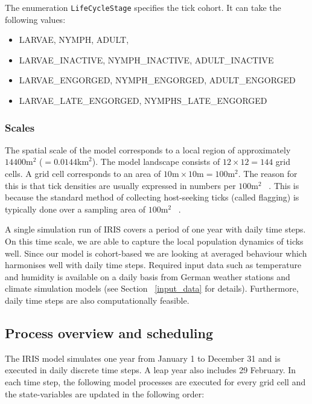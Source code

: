 \documentclass[a4paper, 11pt]{scrartcl}
\newcommand{\inlinecode}[1]{\texttt{\small #1}}
\begin{document}
The enumeration \inlinecode{LifeCycleStage} specifies the tick cohort. It can take the following values:
\begin{small}
\begin{itemize}[noitemsep]
	\item LARVAE, NYMPH, ADULT,  
	\item LARVAE\_INACTIVE, NYMPH\_INACTIVE, ADULT\_INACTIVE
	\item LARVAE\_ENGORGED, NYMPH\_ENGORGED, ADULT\_ENGORGED
	\item LARVAE\_LATE\_ENGORGED, NYMPHS\_LATE\_ENGORGED
\end{itemize}
\end{small}


\subsubsection{Scales}
The spatial scale of the model corresponds to a local region of approximately $14400 \mathrm{m}^{2}$ ($= 0.0144 \mathrm{km}^{2}$). The model landscape consists of $12 \times 12 = 144$ grid cells. A grid cell corresponds to an area of $10 \mathrm{m} \times 10 \mathrm{m} = 100 \mathrm{m}^{2}$. The reason for this is that tick densities are usually expressed in numbers per $100 \mathrm{m}^{2}$ ~\parencite[see e.g.][Table 2]{Boehnke.2015}. This is because the standard method of collecting host-seeking ticks (called flagging) is typically done over a sampling area of $100 \mathrm{m}^{2}$ ~\parencite{Brugger.2016, Schulz.2014}.

A single simulation run of IRIS covers a period of one year with daily time steps. On this time scale, we are able to capture the local population dynamics of ticks well. Since our model is cohort-based we are looking at averaged behaviour which harmonises well with daily time steps. Required input data such as temperature and humidity is available on a daily basis from German weather stations and climate simulation models (see Section ~\ref{input_data} for details). Furthermore, daily time steps are also computationally feasible.


\subsection{Process overview and scheduling}
The IRIS model simulates one year from January 1 to December 31 and is executed in daily discrete time steps. A leap year also includes 29 February. In each time step, the following model processes are executed for every grid cell and the state-variables are updated in the following order:
\end{document}
